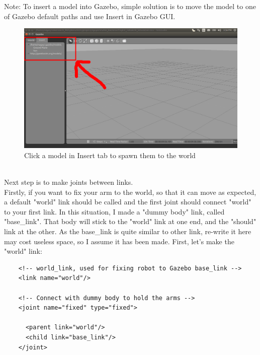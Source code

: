 \documentclass[pdftex,12pt,a4paper]{article}
\begin{document}
  \newpage
  Note: To insert a model into Gazebo, simple solution is to move the model to one of Gazebo default paths and use Insert in Gazebo GUI.
  \begin{figure}[h]
      \centering
      \includegraphics[width=0.9\linewidth]{image/gazebo_insert.png}
      \caption{Click a model in Insert tab to spawn them to the world}
      \label{fig:gazebo_insert}
  \end{figure}\\
  Next step is to make joints between links.\\
  Firstly, if you want to fix your arm to the world, so that it can move as expected, a default "world" link should be called and the first joint should connect "world" to your first link. In this situation, I made a "dummy body" link, called "base\_link". That body will stick to the "world" link at one end, and the "should" link at the other. As the base\_link is quite similar to other link, re-write it here may cost useless space, so I assume it has been made. First, let's make the "world" link:
  \begin{lstlisting}
    <!-- world_link, used for fixing robot to Gazebo base_link -->
    <link name="world"/>
  
    <!-- Connect with dummy body to hold the arms -->
    <joint name="fixed" type="fixed">
    
      <parent link="world"/>
      <child link="base_link"/>
    </joint>
  \end{lstlisting}
  
\end{document}
